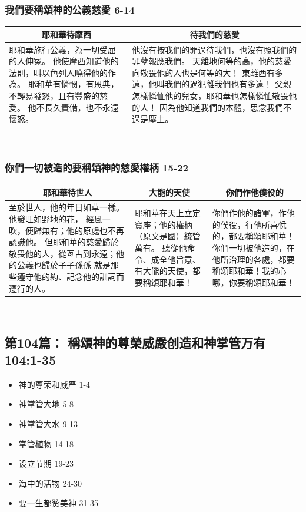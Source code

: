 \subsubsection{我們要稱頌神的公義慈愛 6-14}
\begin{table}[H]
\centering
\begin{tabular}{p{}|p{10.5cm}}\hline\hline
\multicolumn{1}{c|}{耶和華待摩西}&\multicolumn{1}{c}{待我們的慈愛}\\\hline
耶和華施行公義，為一切受屈的人伸冤。
他使摩西知道他的法則，叫以色列人曉得他的作為。
耶和華有憐憫，有恩典，不輕易發怒，且有豐盛的慈愛。
他不長久責備，也不永遠懷怒。
&他沒有按我們的罪過待我們，也沒有照我們的罪孽報應我們。
天離地何等的高，他的慈愛向敬畏他的人也是何等的大！
東離西有多遠，他叫我們的過犯離我們也有多遠！
父親怎樣憐恤他的兒女，耶和華也怎樣憐恤敬畏他的人！
因為他知道我們的本體，思念我們不過是塵土。\\\hline
\end{tabular}
\end{table} 

\subsubsection{你們一切被造的要稱頌神的慈愛權柄 15-22}
\begin{table}[H]
\centering
\begin{tabular}{p{}|p{3.75cm}|p{4.75cm}}\hline\hline
\multicolumn{1}{c|}{耶和華待世人}&\multicolumn{1}{c}{大能的天使}&\multicolumn{1}{c}{你們作他僕役的}\\\hline
至於世人，他的年日如草一樣。他發旺如野地的花，
經風一吹，便歸無有；他的原處也不再認識他。
但耶和華的慈愛歸於敬畏他的人，從亙古到永遠；他的公義也歸於子子孫孫
就是那些遵守他的約、記念他的訓詞而遵行的人。
&耶和華在天上立定寶座；他的權柄（原文是國）統管萬有。
聽從他命令、成全他旨意、有大能的天使，都要稱頌耶和華！
&你們作他的諸軍，作他的僕役，行他所喜悅的，都要稱頌耶和華！
你們一切被他造的，在他所治理的各處，都要稱頌耶和華！我的心哪，你要稱頌耶和華！\\\hline
\end{tabular}
\end{table} 



\subsection{第104篇： 稱頌神的尊榮威嚴创造和神掌管万有 104:1-35}
\begin{itemize}
\itemsep-.45em
\item 神的尊荣和威严 1-4
\item 神掌管大地 5-8
\item 神掌管大水 9-13
\item 掌管植物 14-18
\item 设立节期 19-23
\item 海中的活物 24-30
\item 要一生都赞美神 31-35
\end{itemize}

